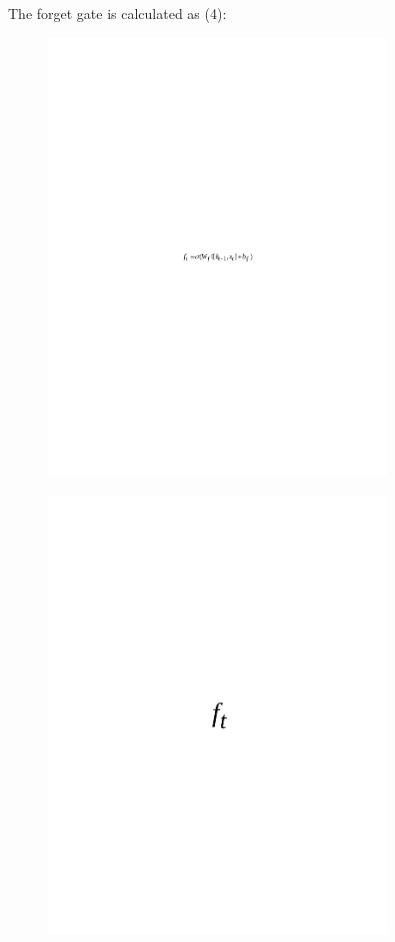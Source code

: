 The forget gate is calculated as (4):

\begin{figure}[H]
	\centering
	\includegraphics[width=0.8\textwidth]{media/ict/image45}
	\caption*{}
\end{figure}


\begin{figure}[H]
	\centering
	\includegraphics[width=0.8\textwidth]{media/ict/image46}
	\caption*{}
\end{figure}

